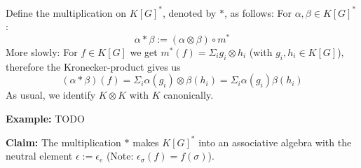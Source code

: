 Define the multiplication on $ K \left\lbrack G \right\rbrack^\ast $, denoted by $\ast$, as follows:  For $\alpha, \beta \in K \left\lbrack G \right\rbrack^\ast$:  
\begin{equation}
  \alpha \ast \beta := \left( \alpha \otimes \beta \right) \circ m^\ast
\end{equation}
More slowly: For $f \in K \left\lbrack G \right\rbrack$ we get $m^\ast \left( f \right) = \Sigma_i g_i \otimes h_i$ (with $g_i , h_i \in K \left\lbrack G \right\rbrack$), therefore the Kronecker-product gives us
\begin{equation}
  \left( \alpha \ast \beta \right) \left( f \right) = \Sigma_i \alpha \left( g_i \right) \otimes \beta \left( h_i \right) = \Sigma_i \alpha \left( g_i \right) \beta \left( h_i \right)
\end{equation}
As usual, we identify $K \otimes K$ with $K$ canonically.  
%
%

\textbf{Example:} TODO

\smallskip
\textbf{Claim:} The multiplication $\ast$ makes $K \left\lbrack G \right\rbrack^\ast$ into an associative algebra with the neutral element $ \epsilon := \epsilon_e$ (Note: $\epsilon_\sigma \left( f \right) = f \left( \sigma \right)$).

